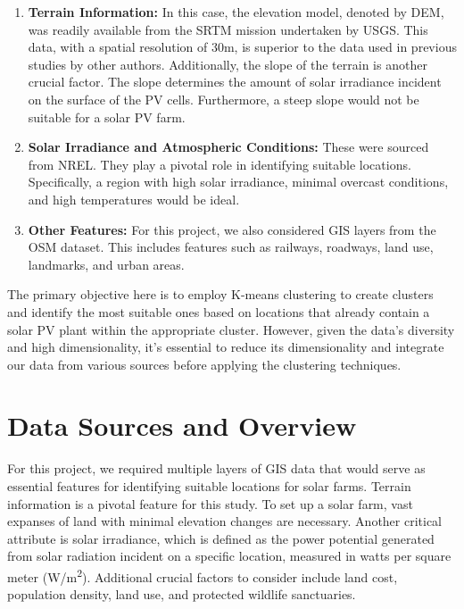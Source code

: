 \documentclass[a4paper,12pt]{Classes/RoboticsLaTeX}
\begin{document}
	\begin{enumerate}
		\item \textbf{Terrain Information:} In this case, the elevation model, denoted by \ac{DEM}, was readily available from the \ac{SRTM} mission undertaken by \ac{USGS}. This data, with a spatial resolution of 30m, is superior to the data used in previous studies by other authors. Additionally, the slope of the terrain is another crucial factor. The slope determines the amount of solar irradiance incident on the surface of the \ac{PV} cells. Furthermore, a steep slope would not be suitable for a solar \ac{PV} farm.
		
		\item \textbf{Solar Irradiance and Atmospheric Conditions:} These were sourced from \ac{NREL}. They play a pivotal role in identifying suitable locations. Specifically, a region with high solar irradiance, minimal overcast conditions, and high temperatures would be ideal.
		
		\item \textbf{Other Features:} For this project, we also considered \ac{GIS} layers from the \ac{OSM} dataset. This includes features such as railways, roadways, land use, landmarks, and urban areas.
	\end{enumerate}
	
	The primary objective here is to employ K-means clustering to create clusters and identify the most suitable ones based on locations that already contain a solar PV plant within the appropriate cluster. 
	However, given the data's diversity and high dimensionality, it's essential to reduce its dimensionality and integrate our data from various sources before applying the clustering techniques.

	\section{Data Sources and Overview}

	For this project, we required multiple layers of GIS data that would serve as essential features for identifying suitable locations for solar farms. 
	Terrain information is a pivotal feature for this study. To set up a solar farm, vast expanses of land with minimal elevation changes are necessary. 
	Another critical attribute is solar irradiance, which is defined as the power potential generated from solar radiation incident on a specific location, 
	measured in watts per square meter (W/m\textsuperscript{2}). Additional crucial factors to consider include land cost, population density, land use, and 
	protected wildlife sanctuaries.
\end{document}
